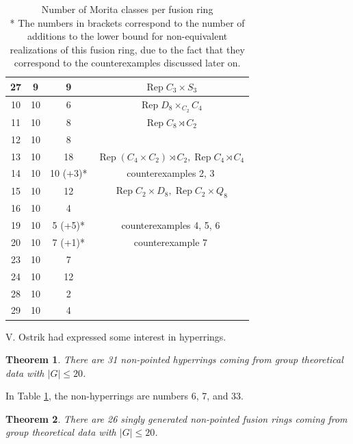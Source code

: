 \documentclass[a4paper, 10pt]{book}
\newtheorem{Thm}{Theorem}[chapter]
\theoremstyle{definition}
\numberwithin{equation}{chapter}
\newcommand\Rep{\operatorname{Rep}}
\newcommand\semidir\rtimes
\begin{document}
\begin{table}[!htbp]
\begin{tabular}{|c|c|c|c|}
27          & 9    & 9                   	&		$\Rep C_3\times S_3$ \\ \hline

10          & 10   & 6                   	&		$\Rep D_8 \times_{C_2} C_4$ \\ \hline
11          & 10   & 8                   	&	$\Rep C_8 \semidir C_2$	 \\ \hline
12          & 10   & 8                   	&		 \\ \hline
13          & 10   & 18                  	&		$\Rep (C_4 \times C_2) \semidir C_2, \Rep C_4\semidir C_4$ \\ \hline
14          & 10   & 10 (+3)*                &  	 counterexamples 2, 3		 \\ \hline
15          & 10   & 12                  	&		$\Rep C_2\times D_8, \Rep C_2\times Q_8$ \\ \hline
16          & 10   & 4                   	&		 \\ \hline
19          & 10   & 5   (+5)*                	& counterexamples 4, 5, 6	 \\ \hline
20          & 10   & 7   (+1)*                	& counterexample 7		 \\ \hline
23          & 10   & 7                   	&		 \\ \hline
24          & 10   & 12                  	&		 \\ \hline
28          & 10   & 2                   	&		 \\ \hline
29          & 10   & 4                   	&		 \\ \hline



\end{tabular}
\caption{ Number of Morita classes per fusion ring\\ * {\small The numbers in brackets correspond to the number of additions to the lower bound for non-equivalent realizations of this fusion ring, due to the fact that they correspond to the counterexamples discussed later on.}}\label{tab}
\end{table}
V. Ostrik had expressed some interest in hyperrings.
\begin{Thm}
There are 31 non-pointed hyperrings coming from group theoretical data with $|G|\leq 20$.
\end{Thm}
In Table \ref{tab}, the non-hyperrings are numbers 6, 7, and 33.
\begin{Thm}
There are 26 singly generated non-pointed fusion rings coming from group theoretical data with $|G|\leq 20$.
\end{Thm}
\end{document}

